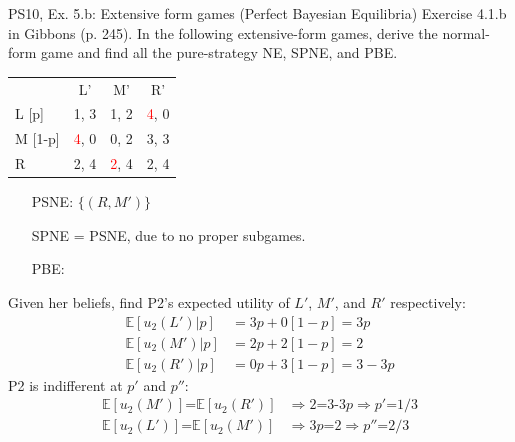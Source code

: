 \begin{frame}{PS10, Ex. 5.b: Extensive form games (Perfect Bayesian Equilibria)}
    Exercise 4.1.b in Gibbons (p. 245). In the following extensive-form games, derive the normal-form game and find all the pure-strategy NE, SPNE, and PBE.
    \vspace{-8pt}
    \begin{multicols}{2}
      \begin{table}
        \begin{tabular}{l|c|c|c|}
          \multicolumn{1}{c}{} & \multicolumn{1}{c}{L'} & \multicolumn{1}{c}{M'} & \multicolumn{1}{c}{R'} \\\cline{2-4}
          L [p]   & 1, \color{blue}3 & 1, 2 & \textcolor{red}{4}, 0 \\\cline{2-4}
          M [1-p] & \textcolor{red}{4}, 0 & 0, 2 & 3, \color{blue}3 \\\cline{2-4}
          R       & 2, \color{blue}4 & \textcolor{red}{2}, \color{blue}4 & 2, \color{blue}4 \\\cline{2-4}
        \end{tabular}
      \end{table} \vspace{-4pt}
      \begin{itemize}
        \item[PSNE:] $\{(R,M')\}$
        \item[SPNE =] PSNE, due to no proper subgames.
        \item[PBE:]
      \end{itemize} \vspace{-4pt}
      Given her beliefs, find P2's expected utility of $L'$, $M'$, and $R'$ respectively: \vspace{-4pt}
      \begin{align*}
        \mathbb{E}[u_2(L')|p]&=3p+0[1-p]=3p\\
        \mathbb{E}[u_2(M')|p]&=2p+2[1-p]=2\\
        \mathbb{E}[u_2(R')|p]&=0p+3[1-p]=3-3p
      \end{align*}
      P2 is indifferent at $p'$ and $p''$: \vspace{-4pt}
      \begin{align*}
        \mathbb{E}[u_2(M')]\text{=}\mathbb{E}[u_2(R')]&\Rightarrow 2\text{=3-3}p\Rightarrow p'\text{=}1/3\\
        \mathbb{E}[u_2(L')]\text{=}\mathbb{E}[u_2(M')]&\Rightarrow 3p\text{=}2\Rightarrow p''\text{=}2/3\\
      \end{align*}

\end{multicols}
\end{frame}
